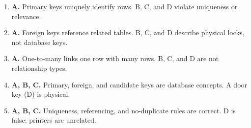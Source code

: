 \documentclass[11pt]{article}
\begin{document}
\begin{enumerate}[label=\textbf{Q\arabic*.}, leftmargin=*]
\item \textbf{A.} Primary keys uniquely identify rows. B, C, and D violate uniqueness or relevance.
\item \textbf{A.} Foreign keys reference related tables. B, C, and D describe physical locks, not database keys.
\item \textbf{A.} One-to-many links one row with many rows. B, C, and D are not relationship types.
\item \textbf{A, B, C.} Primary, foreign, and candidate keys are database concepts. A door key (D) is physical.
\item \textbf{A, B, C.} Uniqueness, referencing, and no-duplicate rules are correct. D is false: printers are unrelated.
\end{enumerate}
\def\JKSSBLessonID{29}\def\JKSSBAnswers{1}
\end{document}
